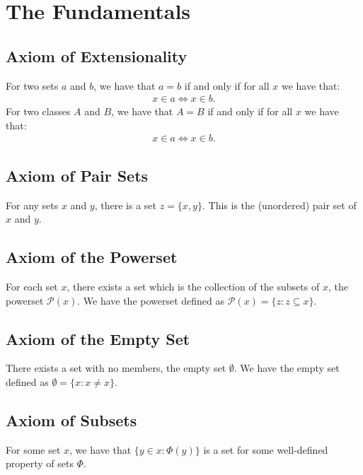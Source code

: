 \section{The Fundamentals}

\subsection{Axiom of Extensionality}

For two sets $a$ and $b$, we have that $a = b$ if and only if for all
$x$ we have that: \begin{align*}
    x \in a \Longleftrightarrow x \in b.
\end{align*} 
For two classes $A$ and $B$, we have that $A = B$ if and only if for all
$x$ we have that: \begin{align*}
    x \in a \Longleftrightarrow x \in b.
\end{align*}

\subsection{Axiom of Pair Sets}

For any sets $x$ and $y$, there is a set $z = \{x, y\}$. This is the
(unordered) pair set of $x$ and $y$.

\subsection{Axiom of the Powerset}

For each set $x$, there exists a set which is the collection of the
subsets of $x$, the powerset $\mathcal{P}(x)$.
We have the powerset defined as 
$\mathcal{P}(x) = \{z : z \subseteq x\}$.

\subsection{Axiom of the Empty Set}

There exists a set with no members, the empty set $\emptyset$.
We have the empty set defined as $\emptyset = \{x : x \neq x\}$.

\subsection{Axiom of Subsets}

For some set $x$, we have that $\{y \in x : \Phi(y)\}$ is a set
for some well-defined property of sets $\Phi$.

